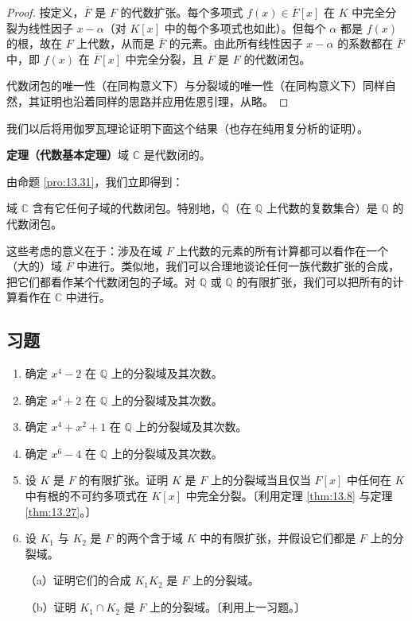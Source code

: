 \begin{proof}
按定义，\(\overline{F}\) 是 \(F\) 的代数扩张。每个多项式 \(f(x) \in \overline{F}[x]\) 在 \(K\) 中完全分裂为线性因子 \(x-\alpha\)（对 \(K[x]\) 中的每个多项式也如此）。但每个 \(\alpha\) 都是 \(f(x)\) 的根，故在 \(F\) 上代数，从而是 \(\overline{F}\) 的元素。由此所有线性因子 \(x-\alpha\) 的系数都在 \(\overline{F}\) 中，即 \(f(x)\) 在 \(\overline{F}[x]\) 中完全分裂，且 \(\overline{F}\) 是 \(F\) 的代数闭包。

代数闭包的唯一性（在同构意义下）与分裂域的唯一性（在同构意义下）同样自然，其证明也沿着同样的思路并应用佐恩引理，从略。
\end{proof}

我们以后将用伽罗瓦理论证明下面这个结果（也存在纯用复分析的证明）。

\noindent\textbf{定理（代数基本定理）}\quad 域 \(\mathbb{C}\) 是代数闭的。

由命题 \ref{pro:13.31}，我们立即得到：

\begin{corollary}\label{cor:13.32}
域 \(\mathbb{C}\) 含有它任何子域的代数闭包。特别地，\(\overline{\mathbb{Q}}\)（在 \(\mathbb{Q}\) 上代数的复数集合）是 \(\mathbb{Q}\) 的代数闭包。
\end{corollary}

这些考虑的意义在于：涉及在域 \(F\) 上代数的元素的所有计算都可以看作在一个（大的）域 \(\overline{F}\) 中进行。类似地，我们可以合理地谈论任何一族代数扩张的合成，把它们都看作某个代数闭包的子域。对 \(\mathbb{Q}\) 或 \(\mathbb{Q}\) 的有限扩张，我们可以把所有的计算看作在 \(\mathbb{C}\) 中进行。

\subsection*{习题}

\begin{enumerate}
\item 确定 \(x^4-2\) 在 \(\mathbb{Q}\) 上的分裂域及其次数。

\item 确定 \(x^4+2\) 在 \(\mathbb{Q}\) 上的分裂域及其次数。

\item 确定 \(x^4+x^2+1\) 在 \(\mathbb{Q}\) 上的分裂域及其次数。

\item 确定 \(x^6-4\) 在 \(\mathbb{Q}\) 上的分裂域及其次数。

\item 设 \(K\) 是 \(F\) 的有限扩张。证明 \(K\) 是 \(F\) 上的分裂域当且仅当 \(F[x]\) 中任何在 \(K\) 中有根的不可约多项式在 \(K[x]\) 中完全分裂。〔利用定理 \ref{thm:13.8} 与定理 \ref{thm:13.27}。〕

\item 设 \(K_1\) 与 \(K_2\) 是 \(F\) 的两个含于域 \(K\) 中的有限扩张，并假设它们都是 \(F\) 上的分裂域。

（a）证明它们的合成 \(K_1K_2\) 是 \(F\) 上的分裂域。

（b）证明 \(K_1 \cap K_2\) 是 \(F\) 上的分裂域。〔利用上一习题。〕
\end{enumerate}

